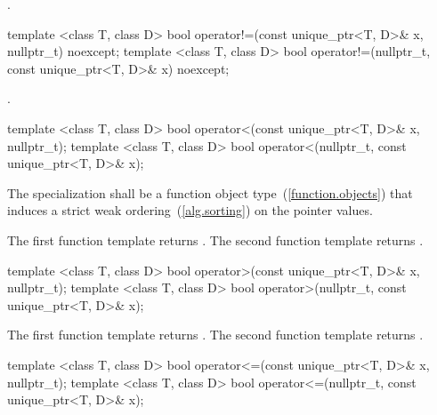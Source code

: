 \begin{itemdescr}
\pnum
\returns {}.
\end{itemdescr}

%
\begin{itemdecl}
template <class T, class D>
  bool operator!=(const unique_ptr<T, D>& x, nullptr_t) noexcept;
template <class T, class D>
  bool operator!=(nullptr_t, const unique_ptr<T, D>& x) noexcept;
\end{itemdecl}

\begin{itemdescr}
\pnum
\returns {}.
\end{itemdescr}

%
\begin{itemdecl}
template <class T, class D>
  bool operator<(const unique_ptr<T, D>& x, nullptr_t);
template <class T, class D>
  bool operator<(nullptr_t, const unique_ptr<T, D>& x);
\end{itemdecl}

\begin{itemdescr}
\pnum
\requires The specialization  shall be
a function object type~(\ref{function.objects}) that induces a strict weak
ordering~(\ref{alg.sorting}) on the pointer values.

\pnum
\returns
The first function template returns
.
The second function template returns
.
\end{itemdescr}

%
\begin{itemdecl}
template <class T, class D>
  bool operator>(const unique_ptr<T, D>& x, nullptr_t);
template <class T, class D>
  bool operator>(nullptr_t, const unique_ptr<T, D>& x);
\end{itemdecl}

\begin{itemdescr}
\pnum
\returns
The first function template returns .
The second function template returns .
\end{itemdescr}

%
\begin{itemdecl}
template <class T, class D>
  bool operator<=(const unique_ptr<T, D>& x, nullptr_t);
template <class T, class D>
  bool operator<=(nullptr_t, const unique_ptr<T, D>& x);
\end{itemdecl}

